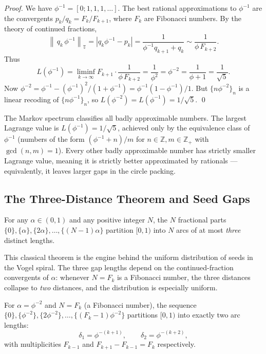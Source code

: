 \begin{proof}
We have $\phi^{-1} = [0; 1,1,1,\ldots]$.  The best rational
approximations to $\phi^{-1}$ are the convergents $p_k/q_k = F_k/F_{k+1}$,
where $F_k$ are Fibonacci numbers.  By the theory of continued
fractions,
\[
  \left\|\,q_k\,\phi^{-1}\right\|_{\mathbb{T}} = \left| q_k \phi^{-1} - p_k \right|
  = \frac{1}{\phi^{-1} q_{k+1} + q_k} \sim \frac{1}{\phi \, F_{k+2}}.
\]
Thus
\[
  L(\phi^{-1}) = \liminf_{k \to \infty} F_{k+1} \cdot
                \frac{1}{\phi \, F_{k+2}}
              = \frac{1}{\phi^2} = \phi^{-2} = \frac{1}{\phi+1} = \frac{1}{\sqrt{5}}.
\]
Now $\phi^{-2} = \phi^{-1} - (\phi^{-1})^2 / (1 + \phi^{-1}) = \phi^{-1}(1 - \phi^{-1}) / 1$.
But $\{n \phi^{-2}\}_n$ is a linear recoding of $\{n \phi^{-1}\}_n$, so
$L(\phi^{-2}) = L(\phi^{-1}) = 1/\sqrt{5}$.
\qed
\end{proof}

The Markov spectrum classifies all badly approximable numbers.  The
largest Lagrange value is $L(\phi^{-1}) = 1/\sqrt{5}$, achieved only
by the equivalence class of $\phi^{-1}$ (numbers of the form
$(\phi^{-1} + n)/m$ for $n \in \mathbb{Z}, m \in \mathbb{Z}_+$ with
$\gcd(n,m)=1$).  Every other badly approximable number has strictly
smaller Lagrange value, meaning it is strictly better approximated by
rationals — equivalently, it leaves larger gaps in the circle packing.

\subsection{The Three-Distance Theorem and Seed Gaps}
\label{subsec:three-distance}

\begin{theorem}
\label{thm:three-distance}
For any $\alpha \in (0,1)$ and any positive integer $N$, the $N$
fractional parts $\{0\}, \{\alpha\}, \{2\alpha\}, \ldots, \{(N-1)\alpha\}$
partition $[0,1)$ into $N$ arcs of at most \emph{three} distinct
lengths.
\end{theorem}

This classical theorem \cite{liang1979three} is the engine behind the
uniform distribution of seeds in the Vogel spiral.  The three gap
lengths depend on the continued-fraction convergents of $\alpha$:
whenever $N = F_k$ is a Fibonacci number, the three distances collapse
to \emph{two} distances, and the distribution is especially uniform.

\begin{corollary}
\label{cor:fibonacci-regularity}
For $\alpha = \phi^{-2}$ and $N = F_k$ (a Fibonacci number), the
sequence $\{0\}, \{\phi^{-2}\}, \{2\phi^{-2}\}, \ldots, \{(F_k-1)\phi^{-2}\}$
partitions $[0,1)$ into exactly two arc lengths:
\[
  \delta_1 = \phi^{-(k+1)}, \qquad \delta_2 = \phi^{-(k+2)},
\]
with multiplicities $F_{k-1}$ and $F_{k+1} - F_{k-1} = F_k$ respectively.
\end{corollary}

